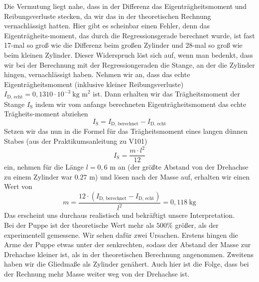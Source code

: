 Die Vermutung liegt nahe, dass in der Differenz das Eigenträgheitsmoment und Reibungsverluste stecken, da wir das in der theoretischen Rechnung vernachlässigt hatten. Hier gibt es scheinbar einen Fehler, denn das Eigenträgheits-moment, das durch die Regressionsgerade berechnet wurde, ist fast 17-mal so groß wie die Differenz beim großen Zylinder und 28-mal so groß wie beim kleinen Zylinder. Dieser Widerspruch löst sich auf, wenn man bedenkt, dass wir bei der Berechnung mit der Regressiongeraden die Stange, an der die Zylinder hingen, vernachlässigt haben. Nehmen wir an, dass das echte Eigenträgheitsmoment (inklusive kleiner Reibungsverluste) $ I_\text{D, echt} = 0,1310\cdot 10^{-3}\ \text{kg\ m}^2 $ ist. Dann erhalten wir das Trägheitsmoment der Stange $ I_\text{S} $ indem wir vom anfangs berechneten Eigenträgheitsmoment das echte Trägheits-moment abziehen
\begin{equation}
	I_\text{S} = I_\text{D, berechnet} - I_\text{D, echt}
\end{equation}
Setzen wir das nun in die Formel für das Trägheitsmoment eines langen dünnen Stabes (aus der Praktikumsanleitung zu V101)
\begin{equation}
	I_\text{S} = \frac{m\cdot l^2}{12}
\end{equation}
ein, nehmen für die Länge $ l = 0,6 $ m an (der größte Abstand von der Drehachse zu einem Zylinder war $ 0.27 $ m) und lösen nach der Masse auf, erhalten wir einen Wert von
\begin{equation}
	m = \frac{12\cdot (I_\text{D, berechnet}-I_\text{D, echt})}{l^2} = 0,118\ \text{kg}
\end{equation}
Das erscheint uns durchaus realistisch und bekräftigt unsere Interpretation. \\

Bei der Puppe ist der theoretische Wert mehr als $ 500 \% $ größer, als der experimentell gemessene. Wir sehen dafür zwei Ursachen. Erstens hingen die Arme der Puppe etwas unter der senkrechten, sodass der Abstand der Masse zur Drehachse kleiner ist, als in der theoretischen Berechnung angenommen. Zweitens haben wir die Gliedmaße als Zylinder genähert. Auch hier ist die Folge, dass bei der Rechnung mehr Masse weiter weg von der Drehachse ist.
